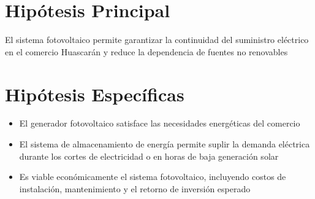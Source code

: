 \section{Hipótesis Principal}
El sistema fotovoltaico permite garantizar la continuidad del suministro eléctrico en el comercio Huascarán y reduce la dependencia de fuentes no renovables

\section{Hipótesis Específicas}
\begin{itemize}
  \item El generador fotovoltaico satisface las necesidades energéticas del comercio
  \item El sistema de almacenamiento de energía permite suplir la demanda eléctrica durante los cortes de electricidad o en horas de baja generación solar
  \item Es viable económicamente el sistema fotovoltaico, incluyendo costos de instalación, mantenimiento y el retorno de inversión esperado
\end{itemize}
